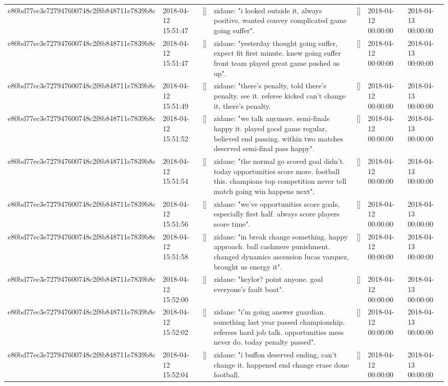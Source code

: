 \begin{tabular}{lllllll}
e80bd77ec3e727947600748c2f8b848711e7839b8c & 2018-04-12 15:51:47 & [] & zidane: "i looked outside it, always positive. wanted convey complicated game going suffer". & [] & 2018-04-12 00:00:00 & 2018-04-13 00:00:00 \\
e80bd77ec3e727947600748c2f8b848711e7839b8c & 2018-04-12 15:51:47 & [] & zidane: "yesterday thought going suffer, expect fit first minute. knew going suffer front team played great game pushed us up". & [] & 2018-04-12 00:00:00 & 2018-04-13 00:00:00 \\
e80bd77ec3e727947600748c2f8b848711e7839b8c & 2018-04-12 15:51:49 & [] & zidane: "there's penalty, told there's penalty. see it. referee kicked can't change it, there's penalty. & [] & 2018-04-12 00:00:00 & 2018-04-13 00:00:00 \\
e80bd77ec3e727947600748c2f8b848711e7839b8c & 2018-04-12 15:51:52 & [] & zidane: "we talk anymore. semi-finals happy it. played good game regular, believed end passing. within two matches deserved semi-final pass happy". & [] & 2018-04-12 00:00:00 & 2018-04-13 00:00:00 \\
e80bd77ec3e727947600748c2f8b848711e7839b8c & 2018-04-12 15:51:54 & [] & zidane: "the normal go scored goal didn't. today opportunities score more. football this. champions top competition never tell match going win happens next". & [] & 2018-04-12 00:00:00 & 2018-04-13 00:00:00 \\
e80bd77ec3e727947600748c2f8b848711e7839b8c & 2018-04-12 15:51:56 & [] & zidane: "we've opportunities score goals, especially first half. always score players score time". & [] & 2018-04-12 00:00:00 & 2018-04-13 00:00:00 \\
e80bd77ec3e727947600748c2f8b848711e7839b8c & 2018-04-12 15:51:58 & [] & zidane: "in break change something. happy approach. ball cashmere punishment. changed dynamics ascension lucas vazquez, brought us energy it". & [] & 2018-04-12 00:00:00 & 2018-04-13 00:00:00 \\
e80bd77ec3e727947600748c2f8b848711e7839b8c & 2018-04-12 15:52:00 & [] & zidane: "keylor? point anyone. goal everyone's fault boat". & [] & 2018-04-12 00:00:00 & 2018-04-13 00:00:00 \\
e80bd77ec3e727947600748c2f8b848711e7839b8c & 2018-04-12 15:52:02 & [] & zidane: "i'm going answer guardian. something last year passed championship. referees hard job talk. opportunities mess never do. today penalty passed". & [] & 2018-04-12 00:00:00 & 2018-04-13 00:00:00 \\
e80bd77ec3e727947600748c2f8b848711e7839b8c & 2018-04-12 15:52:04 & [] & zidane: "i buffon deserved ending, can't change it. happened end change erase done football. & [] & 2018-04-12 00:00:00 & 2018-04-13 00:00:00 \\

\end{tabular}

